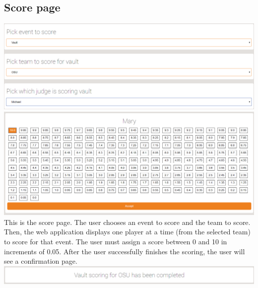 \documentclass[letterpaper,10pt,draftclsnofoot,onecolumn,]{article}
\begin{document}
\subsection{Score page}
\includegraphics[width=\textwidth]{Capture5.png}
\includegraphics[width=\textwidth]{Capture6.png}
This is the score page. The user chooses an event to score and the team to score. Then, the web application displays one player at a time (from the selected team) to score for that event. The user must assign a score between 0 and 10 in increments of 0.05. After the user successfully finishes the scoring, the user will see a confirmation page.
\includegraphics[width=\textwidth]{Capture8.png}
\end{document}
